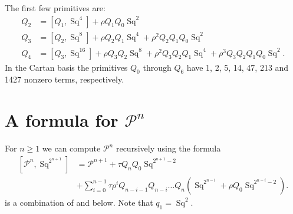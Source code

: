 \documentclass[11pt,hyp]{nyjm}
\newcommand{\PP}{\mathcal{P}}
\newcommand{\Sq}{\operatorname{Sq}}
\theoremstyle{theoremstyle}
\theoremstyle{definition}
\theoremstyle{theoremstyle}
\begin{document}
The first few primitives are:
\begin{align*}
  Q_2 &= [Q_1, \Sq^4] + \rho Q_1 Q_0 \Sq^{2} \\
  Q_3 &= [Q_2, \Sq^8] + \rho Q_2 Q_1 \Sq^{4} + \rho^2 Q_2 Q_1 Q_0 \Sq^{2} \\
  Q_4 &= [Q_3, \Sq^{16}] + \rho Q_3 Q_2 \Sq^{8} + \rho^2 Q_3 Q_2 Q_1\Sq^{4} + \rho^3 Q_3 Q_2 Q_1 Q_0\Sq^2{}.
\end{align*}
In the Cartan basis the primitives $Q_0$ through $Q_6$ have 1, 2, 5, 14, 47, 213 and 1427 nonzero terms, respectively.
\section{A formula for $\PP^n$}
For $n \geq 1$ we can compute $\PP^n$ recursively using the formula
\begin{align}
  \label{eq:qn}
  [\PP^n, \Sq^{2^{n+1}}]
  & = \PP^{n+1} + \tau Q_n Q_0 \Sq^{2^{n+1} - 2} \\
  & + \sum_{i=0}^{n-1}\tau\rho^i Q_{n-i-1}Q_{n-i}\dots Q_n (\Sq^{2^{n-i}} + \rho Q_0 \Sq^{2^{n-i} - 2}). \nonumber
\end{align}
 is a combination of  and  below.
Note that $q_1 = \Sq^2$.
\end{document}
